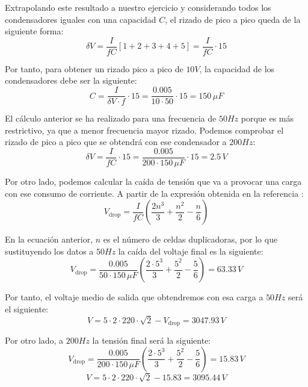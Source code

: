 Extrapolando este resultado a nuestro ejercicio y considerando todos los condensadores iguales con 
una capacidad $C$, el rizado de pico a pico queda de la siguiente forma:
\begin{equation}
    \delta V = \frac{I}{fC}[1+2+3+4+5]=\frac{I}{fC}\cdot15
\end{equation}

Por tanto, para obtener un rizado pico a pico de $10V$, la capacidad de los condensadores debe 
ser la siguiente:
\begin{equation}
    C = \frac{I}{\delta V\cdot f}\cdot15 = \frac{0.005}{10\cdot 50}\cdot 15 = 150\,\mu F
\end{equation}

El cálculo anterior se ha realizado para una frecuencia de $50Hz$ porque es más restrictivo, 
ya que a menor frecuencia mayor rizado. Podemos comprobar el rizado de pico a pico que se obtendrá con ese condensador 
a $200Hz$:
\begin{equation}
    \delta V = \frac{I}{fC}\cdot15 = \frac{0.005}{200\cdot 150\,\mu F}\cdot15 = 2.5\,V
\end{equation}

Por otro lado, podemos calcular la caída de tensión que va a provocar una carga con ese 
consumo de corriente. A partir de la expresión obtenida en la referencia \cite{park2015reduction}:
\begin{equation}
    V_{\text{drop}} = \frac{I}{fC}\left(\frac{2n^3}{3}+\frac{n^2}{2}-\frac{n}{6}\right)
\end{equation}

En la ecuación anterior, $n$ es el número de celdas duplicadoras, por lo que sustituyendo los datos a $50Hz$
la caída del voltaje final es la siguiente:
\begin{equation}
    V_{\text{drop}} = \frac{0.005}{50\cdot 150\,\mu F}\left(\frac{2\cdot5^3}{3}+\frac{5^2}{2}-\frac{5}{6}\right) = 63.33\,V
\end{equation}

Por tanto, el voltaje medio de salida que obtendremos con esa carga a $50Hz$ será el siguiente:
\begin{equation}
    V = 5\cdot2\cdot220\cdot\sqrt{2}-V_{\text{drop}} = 3047.93\,V
\end{equation}

Por otro lado, a $200Hz$ la tensión final será la siguiente:
\begin{equation}
    V_{\text{drop}} = \frac{0.005}{200\cdot 150\,\mu F}\left(\frac{2\cdot5^3}{3}+\frac{5^2}{2}-\frac{5}{6}\right) = 15.83\,V
\end{equation}
\begin{equation}
    V = 5\cdot2\cdot220\cdot\sqrt{2}-15.83= 3095.44\,V
\end{equation}

